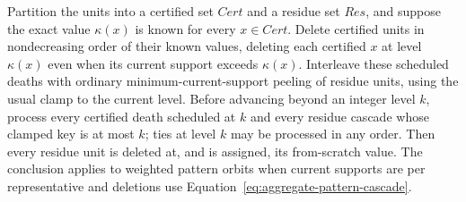 \begin{theorem}
\label{thm:shell-order-replay}
Partition the units into a certified set $\mathit{Cert}$ and a residue set $\mathit{Res}$, and suppose the exact value $\kappa(x)$ is known for every $x\in\mathit{Cert}$.
%
Delete certified units in nondecreasing order of their known values, deleting each certified $x$ at level $\kappa(x)$ even when its current support exceeds $\kappa(x)$.
%
Interleave these scheduled deaths with ordinary minimum-current-support peeling of residue units, using the usual clamp to the current level.
%
Before advancing beyond an integer level $k$, process every certified death scheduled at $k$ and every residue cascade whose clamped key is at most $k$; ties at level $k$ may be processed in any order.
%
Then every residue unit is deleted at, and is assigned, its from-scratch value.
%
The conclusion applies to weighted pattern orbits when current supports are per representative and deletions use Equation~\eqref{eq:aggregate-pattern-cascade}.
\end{theorem}
